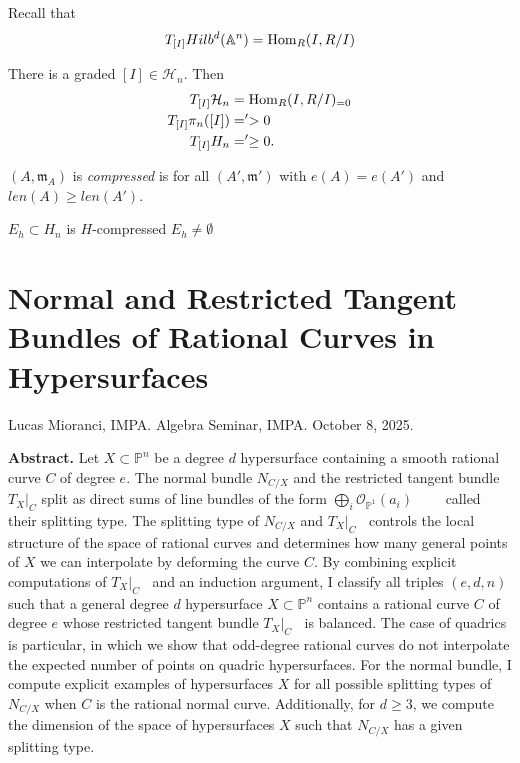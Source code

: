 Recall that
$$
T_{[I]}Hilb^d(\mathbb{A}^n)=\mathop{\mathrm{Hom}}\nolimits_R(I,R/I)
$$
\begin{theorem}[B-B,J,G G G L]
\label{theorem-b-b-j-g-g-g-l}
There is a graded $[I] \in \mathcal{H}_n$.
Then
$$
\begin{aligned}
T_{[I]}\mathcal{H}_n&=\mathop{\mathrm{Hom}}\nolimits_R(I,R/I)_{=0}\\
T_{[I]}\pi_n([I])&='>0\\
T_{[I]}H_n&=' \geq 0.
\end{aligned}
$$
\end{theorem}

\begin{definition}
\label{definition-compressed}
$(A,\mathfrak{m}_A)$ is {\it compressed} is
for all  $(A',\mathfrak{m}')$
with $e(A)=e(A')$ and $len(A) \geq  len(A')
$.
\end{definition}

\begin{theorem}
\label{theorem-e}
$E_h \subset H_n$ is $H$-compressed
$E_h \neq  \emptyset$
\end{theorem}

\section{Normal and Restricted Tangent
Bundles of Rational
Curves in Hypersurfaces}
\label{section-restricted-tangent-bundles}

\noindent
Lucas Mioranci, IMPA.
Algebra Seminar, IMPA.
October 8, 2025.

\medskip\noindent
{\bf Abstract.}
Let $X\subset \mathbb{P}^n$ be a degree $d$
hypersurface containing a smooth
rational curve $C$ of degree $e$. The normal
bundle $N_{C/X}$ and the restricted
tangent bundle $T_X|_C$ split as direct sums
of line bundles of the form
$\bigoplus_i
\mathcal{O}_{\mathbb{P}^1}(a_i)\qquad$ called
their splitting type.
The splitting type of $N_{C/X}$ and
${T_X}|_C\;\;$ controls the local structure
of the space of rational curves and
determines how many general points of $X$ we
can interpolate by deforming the curve $C$.
By combining explicit computations
of $T_X|_C\;\;$ and an induction argument, I
classify all triples $(e,d,n)$ such
that a general degree $d$ hypersurface
$X\subset \mathbb{P}^n$ contains a
rational curve $C$ of degree $e$ whose
restricted tangent bundle ${T_X}|_C\;\;$
is balanced. The case of quadrics is
particular, in which we show that
odd-degree rational curves do not interpolate
the expected number of points on
quadric hypersurfaces.  For the normal
bundle, I compute explicit examples of
hypersurfaces $X$ for all possible splitting
types of $N_{C/X}$ when $C$ is the
rational normal curve. Additionally, for
$d\ge 3$, we compute the dimension of
the space of hypersurfaces $X$ such that
$N_{C/X}$ has a given splitting type.



